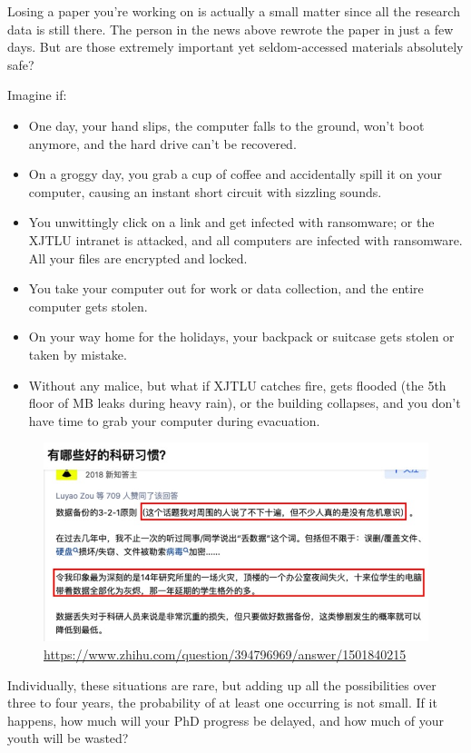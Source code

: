 Losing a paper you're working on is actually a small matter since all the research data is still there. The person in the news above rewrote the paper in just a few days. But are those extremely important yet seldom-accessed materials absolutely safe?

Imagine if:
\begin{itemize}
    \item One day, your hand slips, the computer falls to the ground, won't boot anymore, and the hard drive can't be recovered.
    \item On a groggy day, you grab a cup of coffee and accidentally spill it on your computer, causing an instant short circuit with sizzling sounds.
    \item You unwittingly click on a link and get infected with ransomware; or the XJTLU intranet is attacked, and all computers are infected with ransomware. All your files are encrypted and locked.
    \item You take your computer out for work or data collection, and the entire computer gets stolen.
    \item On your way home for the holidays, your backpack or suitcase gets stolen or taken by mistake.
    \item Without any malice, but what if XJTLU catches fire, gets flooded (the 5th floor of MB leaks during heavy rain), or the building collapses, and you don't have time to grab your computer during evacuation.
\end{itemize}

\begin{figure}[H]
    \centering
    \includegraphics[width=0.8\columnwidth]{author-folder/Kai.Wu/backup_zhihu.jpg}
    \caption{\url{https://www.zhihu.com/question/394796969/answer/1501840215}}
\end{figure}

Individually, these situations are rare, but adding up all the possibilities over three to four years, the probability of at least one occurring is not small. If it happens, how much will your PhD progress be delayed, and how much of your youth will be wasted?

